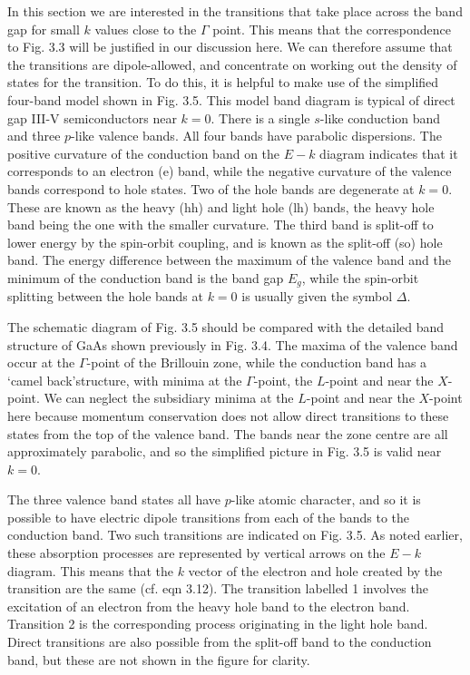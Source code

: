 \documentclass[12pt]{book}
\begin{document}
In this section we are interested in the transitions that take place across the band gap for small $k$ values close to the $\Gamma$ point. This means that the correspondence to Fig. 3.3 will be justified in our discussion here. We can therefore assume that the transitions are dipole-allowed, and concentrate on working out the density of states for the transition. To do this, it is helpful to make use of the simplified four-band model shown in Fig. 3.5. This model band diagram is typical of direct gap III-V semiconductors near $k = 0$. There is a single $s$-like conduction band and three $p$-like valence bands. All four bands have parabolic dispersions. The positive curvature of the conduction band on the $E-k$ diagram indicates that it corresponds to an electron (e) band, while the negative curvature of the valence bands correspond to hole states. Two of the hole bands are degenerate at $k = 0$. These are known as the heavy (hh) and light hole (lh) bands, the heavy hole band being the one with the smaller curvature. The third band is split-off to lower energy by the spin-orbit coupling, and is known as the split-off (so) hole band. The energy difference between the maximum of the valence band and the minimum of the conduction band is the band gap $E_g$, while the spin-orbit splitting between the hole bands at $k = 0$ is usually given the symbol $\Delta$.

The schematic diagram of Fig. 3.5 should be compared with the detailed band structure of GaAs shown previously in Fig. 3.4. The maxima of the valence band occur at the $\Gamma$-point of the Brillouin zone, while the conduction band has a \lq camel back\rq structure, with minima at the $\Gamma$-point, the $L$-point and near the $X$-point. We can neglect the subsidiary minima at the $L$-point and near the $X$-point here because momentum conservation does not allow direct transitions to these states from the top of the valence band. The bands near the zone centre are all approximately parabolic, and so the simplified picture in Fig. 3.5 is valid near $k = 0$.

The three valence band states all have $p$-like atomic character, and so it is possible to have electric dipole transitions from each of the bands to the conduction band. Two such transitions are indicated on Fig. 3.5. As noted earlier, these absorption processes are represented by vertical arrows on the $E-k$ diagram. This means that the $k$ vector of the electron and hole created by the transition are the same (cf. eqn 3.12). The transition labelled 1 involves the excitation of an electron from the heavy hole band to the electron band. Transition 2 is the corresponding process originating in the light hole band. Direct transitions are also possible from the split-off band to the conduction band, but these are not shown in the figure for clarity.
\end{document}
